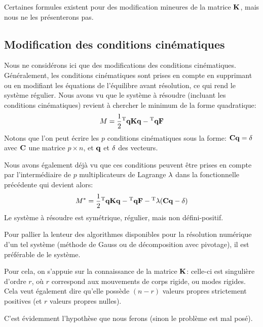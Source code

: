 Certaines formules existent pour des modification mineures de la matrice $\mathbf{K}$, mais nous ne les
présenterons pas.

\medskip
\subsection{Modification des conditions cinématiques}
Nous ne considérons ici que des modifications des conditions cinématiques.
Généralement, les conditions cinématiques sont prises en compte en supprimant ou en
modifiant les équations de l'équilibre avant résolution, ce qui rend le système régulier.
Nous avons vu que le système à résoudre (incluant les conditions cinématiques) revient
à chercher le minimum de la forme quadratique:
\begin{equation}M=\frac12 {}^\mathrm{T}\mathbf{q}\mathbf{K}\mathbf{q} -{}^\mathrm{T}\mathbf{q}\mathbf{F}\end{equation}
Notons que l'on peut écrire les $p$ conditions cinématiques sous la forme:
$\mathbf{C}\mathbf{q} = \mathbf{\delta}$
avec $\mathbf{C}$ une matrice $p\times n$, et $\mathbf{q}$ et $\mathbf{\delta}$ des vecteurs.

Nous avons également déjà vu que ces conditions peuvent être prises en compte
par l'intermédiaire de $p$ multiplicateurs de Lagrange $\mathbf{\lambda}$ dans la fonctionnelle précédente
qui devient alors:
\begin{equation}
M^*=\frac12 {}^\mathrm{T}\mathbf{q}\mathbf{K}\mathbf{q} -{}^\mathrm{T}\mathbf{q}\mathbf{F} - {}^\mathrm{T}\mathbf{\lambda}(\mathbf{C}\mathbf{q} - \mathbf{\delta})
\end{equation}
Le système à résoudre est symétrique, régulier, mais non défini-positif.

\medskip
Pour pallier la lenteur des algorithmes disponibles pour la résolution numérique d'un tel
système (méthode de Gauss ou de décomposition avec pivotage), il est préférable
de  le système.

Pour cela, on s'appuie sur la connaissance de la matrice $\mathbf{K}$: celle-ci est singulière d'ordre
$r$, où $r$ correspond aux mouvements de corps rigide, ou modes rigides. Cela veut
également dire qu'elle possède $(n-r)$ valeurs propres strictement positives (et $r$ valeurs
propres nulles).

 C'est évidemment l'hypothèse que
nous ferons (sinon le problème est mal posé).

